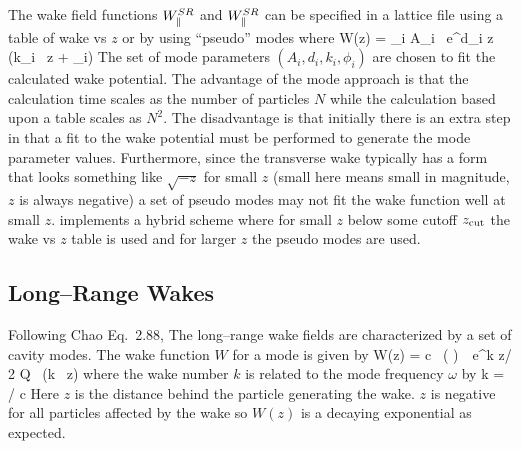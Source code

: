 The wake field functions $W^{SR}_\parallel$ and $W^{SR}_\parallel$ can be specified in a \bmad
lattice file using a table of wake vs $z$ or by using ``pseudo'' modes
where
\Begineq
  W(z) = \sum_i A_i \, e^{d_i z} \, \sin (k_i \, z + \phi_i)
  \label{wadzk}
\Endeq
The set of mode parameters $(A_i, d_i, k_i, \phi_i)$ are chosen to fit
the calculated wake potential. The advantage of the mode approach is that
the calculation time scales as the number of particles $N$ while the
calculation based upon a table scales as $N^2$. The disadvantage is that
initially there is an extra step in that a fit to the wake potential must
be performed to generate the mode parameter values. Furthermore, since the
transverse wake typically has a form that looks something like $\sqrt{-z}$ 
for small $z$ (small here means small in magnitude, $z$ is always negative)
a set of pseudo modes may not fit the wake function well at small $z$. 
\bmad implements a hybrid scheme where for small $z$ below some cutoff
$z_{\rm{cut}}$ the wake vs $z$ table is used and for larger $z$ the pseudo
modes are used.


\subsection{Long--Range Wakes}

Following Chao\cite{b:chao} Eq.~2.88, The long--range wake fields are
characterized by a set of cavity modes. The wake function $W$ for a
mode is given by
\Begineq
  W(z) = c \, \left(  \right) \,\,
  e^{k z/ 2 Q} \, \sin (k \, z)
\Endeq
where the wake number $k$ is related to the mode frequency $\omega$ by
\Begineq
  k = \omega / c
\Endeq
Here $z$ is the distance behind the particle generating the wake. $z$
is negative for all particles affected by the wake so $W(z)$ is a
decaying exponential as expected.

